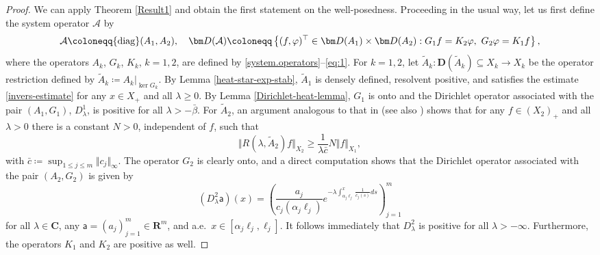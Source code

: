 \documentclass[a4paper,11pt,reqno]{amsart}
\def\la{\lambda}
\def\calA{{\mathcal{A}}}
\def\R{\mathbf{R}}
\def\C{\mathbf{C}}
\theoremstyle{plain}
\numberwithin{equation}{section}
\begin{document}
\begin{proof}
We can apply Theorem \ref{Result1} and obtain the first statement on the well-posedness. Proceeding in the usual way, let us first define the system operator $\mathcal{A}$ by
\begin{equation}\label{eqsysop123}
\calA \coloneqq {\rm diag}(A_1,A_2),\quad
 {\bm D}(\calA)\coloneqq \left\{(f, \varphi)^\top\in {\bm D}(A_1)\times {\bm D}(A_2): G_1 f=K_2 \varphi,~ G_2 \varphi=K_1 f \right\},
\end{equation}
where the operators $A_k$, $G_k$, $K_k$, $k=1,2$, are defined by \eqref{system.operators}--\eqref{eq:1}. For $k=1,2$, let $\tilde{A}_k:{\bm D}(\tilde{A}_k)\subseteq X_k\to X_k$ be the operator restriction defined by $\tilde{A}_k\coloneqq A_k\vert_{\ker G_k}$. By Lemma \ref{heat-star-exp-stab}, $\tilde{A}_1$ is densely defined, resolvent positive, and satisfies the estimate \eqref{invers-estimate} for any $x\in X_+$ and all $\lambda\ge 0$. By Lemma \ref{Dirichlet-heat-lemma}, $G_1$ is onto and the Dirichlet operator associated with the pair $(A_1,G_1)$, $D_\la^1$, is positive for all $\lambda>-\bar{\beta}$. For $\tilde{A}_2$, an argument analogous to that in \cite[Proposition 3]{MR4711370} (see also \cite[Lemma A.1]{EZZL}) shows that for any $f\in (X_2)_+$ and all $\lambda> 0$ there is a constant $N>0$, independent of $f$, such that
\begin{equation*}
\Vert R(\lambda,\tilde{A}_2)f\Vert_{X_2}\ge \frac{1}{\lambda \bar{c}}N\Vert f\Vert_{X_1},
\end{equation*}
with $\bar{c}\coloneqq \sup_{1 \le j\le m}\Vert c_j\Vert_\infty$. The operator $G_2$ is clearly onto, and a direct computation shows that the Dirichlet operator associated with the pair $(A_2,G_2)$ is given by 
\begin{equation*}
(D_\la^2 \mathsf{a})(x)=\left(\frac{a_j}{c_j(\alpha_j\ell_j)}e^{-\la\int_{\alpha_j\ell_j}^{x}\frac{1}{c_j(s)}ds}\right)_{j=1}^m
\end{equation*}
for all $\la\in \C$, any $\mathsf{a}=(a_j)_{j=1}^m\in \R^m$, and a.e.\ $x\in [\alpha_j\ell_{j},\ell_{j}]$. It follows immediately that $D_\la^2$ is positive for all $\lambda>-\infty$. Furthermore, the operators $K_1$ and $K_2$ are positive as well.


\end{proof}
\end{document}
